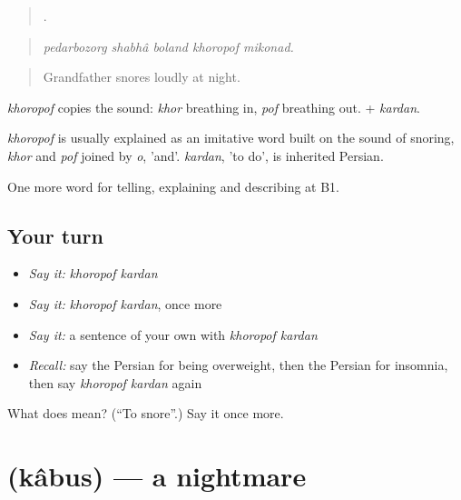 \begin{quote}
    .
\end{quote}

\begin{quote}
\emph{pedarbozorg shabhâ boland khoropof mikonad.}
\end{quote}

\begin{quote}
Grandfather snores loudly at night.
\end{quote}

\emph{khoropof} copies the sound: \emph{khor} breathing in, \emph{pof} breathing out. + \emph{kardan}.

\begin{cousinweb}
\emph{khoropof} is usually explained as an imitative word built on the sound of snoring, \emph{khor} and \emph{pof} joined by \emph{o}, 'and'. \emph{kardan}, 'to do', is inherited Persian.
\end{cousinweb}

\begin{grammarlens}[title={What you've built}]
One more word for telling, explaining and describing at B1.
\end{grammarlens}

\subsection*{Your turn}
\begin{itemize}
\raggedright
  \item \emph{Say it:} \emph{khoropof kardan}
  \item \emph{Say it:} \emph{khoropof kardan}, once more
  \item \emph{Say it:} a sentence of your own with \emph{khoropof kardan}
  \item \emph{Recall:} say the Persian for being overweight, then the Persian for insomnia, then say \emph{khoropof kardan} again
\end{itemize}

\begin{tcolorbox}[breakable,colback=teal!4,colframe=teal!35!black,title={Before you move on}]
What does   mean? (\textquotedblleft{}To snore\textquotedblright{}.) Say it once more.
\end{tcolorbox}
\section[\texorpdfstring{\fa{کابوس} (kâbus)}{کابوس (kâbus)}]{ (kâbus) — a nightmare}

